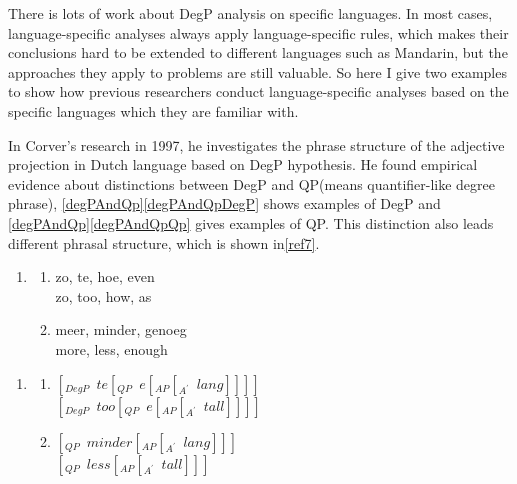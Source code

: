 \documentclass{ctexart}
\let \cite \parencite
\begin{document}
There is lots of work about DegP analysis on specific languages. In most cases, language-specific analyses always apply language-specific rules, which makes their conclusions hard to be extended to different languages such as Mandarin, but the approaches they apply to problems are still valuable. So here I give two examples to show how previous researchers conduct language-specific analyses based on the specific languages which they are familiar with.

In Corver's research in 1997, he investigates the phrase structure of the adjective projection in Dutch language \cite{corver1997a} based on DegP hypothesis. He found empirical evidence about distinctions between DegP and QP(means quantifier-like degree phrase), \ref{degPAndQp}\ref{degPAndQpDegP} shows examples of DegP and \ref{degPAndQp}\ref{degPAndQpQp} gives examples of QP. This distinction also leads different phrasal structure, which is shown in\ref{ref7}. 

\begin{enumerate}[resume]
\item \label{degPAndQp}
\begin{enumerate}
\item \label{degPAndQpDegP} 
zo, te, hoe, even \\
zo, too, how, as
\item \label{degPAndQpQp}
meer, minder, genoeg \\
more, less, enough
\end{enumerate}
\end{enumerate}

\begin{enumerate}[resume]
\item \label{ref7}

\begin{enumerate}
\item \label{ref7a} 
$[_{DegP} \enspace te[_{QP} \enspace e[_{AP}[_{A^{\prime}} \enspace lang]]]]$ \\
$[_{DegP} \enspace too[_{QP} \enspace e[_{AP}[_{A^{\prime}} \enspace tall]]]]$
\item \label{ref7b} 
$[_{QP} \enspace minder[_{AP}[_{A^{\prime}}\enspace lang]]]$ \\
$[_{QP} \enspace less[_{AP}[_{A^{\prime}}\enspace tall]]]$

\end{enumerate} 
    
\end{enumerate} 
\end{document}
